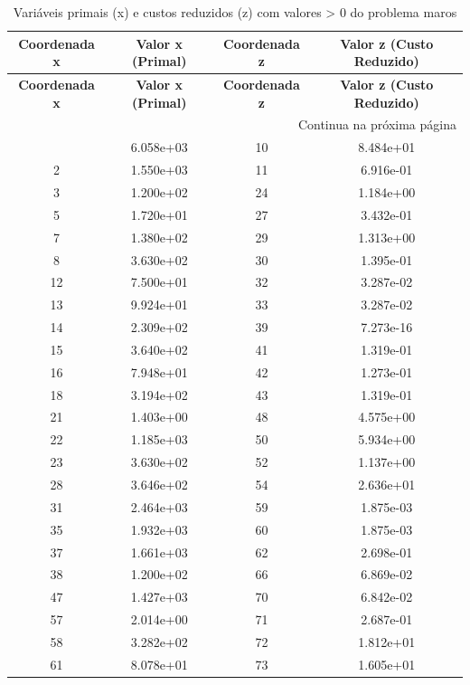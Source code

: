 \documentclass[12pt]{article}
\begin{document}
\begin{longtable}{@{}cccc@{}}
\caption{Variáveis primais (x) e custos reduzidos (z) com valores > 0 do problema maros} \\
\toprule
\textbf{Coordenada x} & \textbf{Valor x (Primal)} & \textbf{Coordenada z} & \textbf{Valor z (Custo Reduzido)} \\
\midrule
\endfirsthead

\toprule
\textbf{Coordenada x} & \textbf{Valor x (Primal)} & \textbf{Coordenada z} & \textbf{Valor z (Custo Reduzido)} \\
\midrule
\endhead

\midrule \multicolumn{4}{r}{{Continua na próxima página}} \\ \midrule
\endfoot

\bottomrule
\endlastfoot
1 & 6.058e+03 & 10 & 8.484e+01 \\
2 & 1.550e+03 & 11 & 6.916e-01 \\
3 & 1.200e+02 & 24 & 1.184e+00 \\
5 & 1.720e+01 & 27 & 3.432e-01 \\
7 & 1.380e+02 & 29 & 1.313e+00 \\
8 & 3.630e+02 & 30 & 1.395e-01 \\
12 & 7.500e+01 & 32 & 3.287e-02 \\
13 & 9.924e+01 & 33 & 3.287e-02 \\
14 & 2.309e+02 & 39 & 7.273e-16 \\
15 & 3.640e+02 & 41 & 1.319e-01 \\
16 & 7.948e+01 & 42 & 1.273e-01 \\
18 & 3.194e+02 & 43 & 1.319e-01 \\
21 & 1.403e+00 & 48 & 4.575e+00 \\
22 & 1.185e+03 & 50 & 5.934e+00 \\
23 & 3.630e+02 & 52 & 1.137e+00 \\
28 & 3.646e+02 & 54 & 2.636e+01 \\
31 & 2.464e+03 & 59 & 1.875e-03 \\
35 & 1.932e+03 & 60 & 1.875e-03 \\
37 & 1.661e+03 & 62 & 2.698e-01 \\
38 & 1.200e+02 & 66 & 6.869e-02 \\
47 & 1.427e+03 & 70 & 6.842e-02 \\
57 & 2.014e+00 & 71 & 2.687e-01 \\
58 & 3.282e+02 & 72 & 1.812e+01 \\
61 & 8.078e+01 & 73 & 1.605e+01 \\

\end{longtable}
\end{document}
